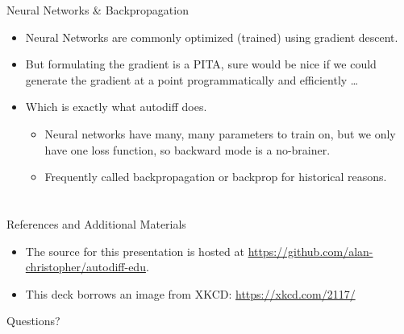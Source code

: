\documentclass[pdf]{beamer}
\makeatletter
\def\beamer@writeslidentry@miniframesoff{%
  \expandafter\beamer@ifempty\expandafter{\beamer@framestartpage}{}%
  {%
    \clearpage\beamer@notesactions%
  }
}
\newcommand*{\miniframesoff}{\let\beamer@writeslidentry=\beamer@writeslidentry@miniframesoff}
\makeatother
\begin{document}
\begin{frame}{Neural Networks \& Backpropagation}
  \begin{itemize}
  \item Neural Networks are commonly optimized (trained) using gradient descent.
  \item But formulating the gradient is a PITA, sure would be nice if we could
    generate the gradient at a point programmatically and efficiently \ldots
  \item Which is exactly what autodiff does.
    \begin{itemize}
    \item Neural networks have many, many parameters to train on, but we only
      have one loss function, so backward mode is a no-brainer.
    \item Frequently called backpropagation or backprop for historical reasons.
    \end{itemize}
  \end{itemize}
\end{frame}

\miniframesoff
\section*{}
\begin{frame}{References and Additional Materials}
  \begin{itemize}
  \item The source for this presentation is hosted at
    \url{https://github.com/alan-christopher/autodiff-edu}.

  \item This deck borrows an image from XKCD: \url{https://xkcd.com/2117/}
  \end{itemize}
\end{frame}

\begin{frame}{Questions?}
\end{frame}
\end{document}
